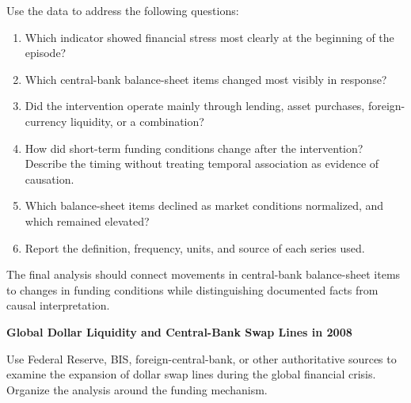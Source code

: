 Use the data to address the following questions:

\begin{enumerate}

\item Which indicator showed financial stress most clearly at the beginning of the episode?

\item Which central-bank balance-sheet items changed most visibly in response?

\item Did the intervention operate mainly through lending, asset purchases, foreign-currency liquidity, or a combination?

\item How did short-term funding conditions change after the intervention? Describe the timing without treating temporal association as evidence of causation.

\item Which balance-sheet items declined as market conditions normalized, and which remained elevated?

\item Report the definition, frequency, units, and source of each series used.

\end{enumerate}

The final analysis should connect movements in central-bank balance-sheet items to changes in funding conditions while distinguishing documented facts from causal interpretation.






\textbf{Global Dollar Liquidity and Central-Bank Swap Lines in 2008}

Use Federal Reserve, BIS, foreign-central-bank, or other authoritative sources to examine the expansion of dollar swap lines during the global financial crisis. Organize the analysis around the funding mechanism.

